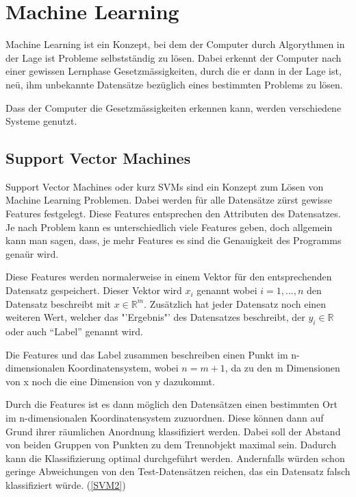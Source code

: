 \newcommand{\norm}[1]{\left\lVert#1\right\rVert}


\section{Machine Learning}
\author{Farhadiba Mohammed, Dennis Kempf, David Steinmann}
Machine Learning ist ein Konzept, bei dem der Computer durch Algorythmen in der Lage ist Probleme selbstständig zu lösen. Dabei erkennt der Computer nach einer gewissen Lernphase Gesetzmässigkeiten, durch die er dann in der Lage ist, neü, ihm unbekannte Datensätze bezüglich eines bestimmten Problems zu lösen.

Dass der Computer die Gesetzmässigkeiten erkennen kann, werden verschiedene Systeme genutzt.

\subsection{Support Vector Machines}
\author{David Steinmann}
Support Vector Machines oder kurz SVMs sind ein Konzept zum Lösen von Machine Learning Problemen.
Dabei werden für alle Datensätze zürst gewisse Features festgelegt. Diese Features entsprechen den Attributen des Datensatzes. Je nach Problem kann es unterschiedlich viele Features geben, doch allgemein kann man sagen, dass, je mehr Features es sind die Genauigkeit des Programms genaür wird.

Diese Features werden normalerweise in einem Vektor für den entsprechenden Datensatz gespeichert.
Dieser Vektor wird $x_{i}$ genannt wobei $i = 1, ..., n$ den Datensatz beschreibt mit  $x \in  \mathbb{R}^m$.
Zusätzlich hat jeder Datensatz noch einen weiteren Wert, welcher das "'Ergebnis"' des Datensatzes beschreibt, der $y_{i} \in \mathbb{R}$ oder auch "`Label"' genannt wird.

Die Features und das Label zusammen beschreiben einen Punkt im n-dimensionalen Koordinatensystem, wobei $n = m + 1$, da zu den m Dimensionen von x noch die eine Dimension von y dazukommt.

Durch die Features ist es dann möglich den Datensätzen einen bestimmten Ort im n-dimensionalen Koordinatensystem zuzuordnen. Diese können dann auf Grund ihrer räumlichen Anordnung klassifiziert werden. Dabei soll der Abstand von beiden Gruppen von Punkten zu dem Trennobjekt maximal sein. Dadurch kann die Klassifizierung optimal durchgeführt werden. Andernfalls würden schon geringe Abweichungen von den Test-Datensätzen reichen, das ein Datensatz falsch klassifiziert würde. (\ref{SVM2}) %

